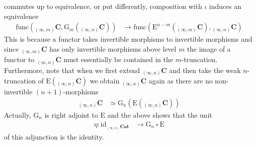 \begin{itemize}
\begin{equation*}
\end{equation*}
commutes up to equivalence, or put differently, composition with $\iota$ induces an equivalence
\begin{align*}
  \mathrm{func}
  \left(
    {_{(\infty,m)}}\mathbf{C}
    ,
    \mathrm{G}_{m}
    \left(
      {_{(\infty,n)}}\mathbf{C}
    \right)
  \right)
  &\to
  \mathrm{func}
  \left(
    \mathrm{E}^{n-m}
    \left(
      {_{(\infty,m)}}\mathbf{C}
    \right)
    ,
    {_{(\infty,n)}}\mathbf{C}
  \right)
\end{align*}
This is because a functor takes invertible morphisms to invertible morphisms and since ${_{(\infty,m)}}\mathbf{C}$ has only invertible morphisms above level $m$ the image of a functor to ${_{(\infty,n)}}\mathbf{C}$ must essentially be contained in the $m$-truncation.
\\
Furthermore, note that when we first extend ${_{(\infty,n)}}\mathbf{C}$ and then take the weak $n$-truncation of $\mathrm{E}({_{(\infty,n)}}\mathbf{C})$ we obtain ${_{(\infty,n)}}\mathbf{C}$ again as there are no non-invertible $(n+1)$-morphisms
\begin{align*}
  {_{(\infty,n)}}\mathbf{C}
  &\simeq
  \mathrm{G}_{n}
  \left(
    \mathrm{E}({_{(\infty,n)}}\mathbf{C})
  \right)
\end{align*}
Actually, $\mathrm{G}_{n}$ is right adjoint to $\mathrm{E}$ and the above shows that the unit
\begin{align*}
  \eta
  \colon
  \mathrm{id}_{{_{(\infty,n)}}\mathbf{Cat}}
  &\to
  \mathrm{G}_{n}
  \circ
  \mathrm{E}
\end{align*}
of this adjunction is the identity.


\end{itemize}
